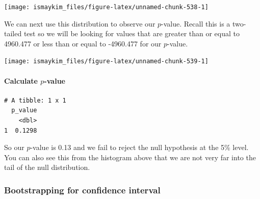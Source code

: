 \documentclass[12pt, krantz2,]{krantz}
\makeatletter
\newenvironment{Shaded}{\begin{snugshade}}{\end{snugshade}}
\newcommand{\DataTypeTok}[1]{\textcolor[rgb]{0.27,0.27,0.27}{#1}}
\newcommand{\KeywordTok}[1]{\textcolor[rgb]{0.27,0.27,0.27}{\textbf{#1}}}
\newcommand{\NormalTok}[1]{#1}
\newcommand{\OperatorTok}[1]{\textcolor[rgb]{0.43,0.43,0.43}{\textbf{#1}}}
\newcommand{\StringTok}[1]{\textcolor[rgb]{0.5,0.5,0.5}{#1}}
\let\oldparagraph\paragraph
\renewcommand{\paragraph}[1]{\oldparagraph{#1}\mbox{}}
\newenvironment{kframe}{%
\medskip{}
\setlength{\fboxsep}{.8em}
 \def\at@end@of@kframe{}%
 \ifinner\ifhmode%
  \def\at@end@of@kframe{\end{minipage}}%
  \begin{minipage}{\columnwidth}%
 \fi\fi%
 \def\FrameCommand##1{\hskip\@totalleftmargin \hskip-\fboxsep
 \colorbox{shadecolor}{##1}\hskip-\fboxsep
     \hskip-\linewidth \hskip-\@totalleftmargin \hskip\columnwidth}%
 \MakeFramed {\advance\hsize-\width
   \@totalleftmargin\z@ \linewidth\hsize
   \@setminipage}}%
 {\par\unskip\endMakeFramed%
 \at@end@of@kframe}
\renewenvironment{Shaded}{\begin{kframe}}{\end{kframe}}
\makeatother
\begin{document}
\begin{center}\texttt{[image: ismaykim\_files/figure-latex/unnamed-chunk-538-1]} \end{center}

We can next use this distribution to observe our \(p\)-value. Recall this is a two-tailed test so we will be looking for values that are greater than or equal to 4960.477 or less than or equal to -4960.477 for our \(p\)-value.

\begin{Shaded}
\end{Shaded}

\begin{center}\texttt{[image: ismaykim\_files/figure-latex/unnamed-chunk-539-1]} \end{center}

\hypertarget{calculate-p-value-3}{%
\paragraph{\texorpdfstring{Calculate \(p\)-value}{Calculate p-value}}\label{calculate-p-value-3}}

\begin{Shaded}
\end{Shaded}

\begin{verbatim}
# A tibble: 1 x 1
  p_value
    <dbl>
1  0.1298
\end{verbatim}

So our \(p\)-value is 0.13 and we fail to reject the null hypothesis at the 5\% level. You can also see this from the histogram above that we are not very far into the tail of the null distribution.

\hypertarget{bootstrapping-for-confidence-interval-3}{%
\subsubsection*{Bootstrapping for confidence interval}\label{bootstrapping-for-confidence-interval-3}}
\end{document}
